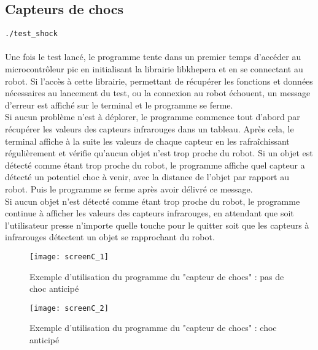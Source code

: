 \documentclass[11pt]{article} %
\begin{document}
\subsection{Capteurs de chocs}
\verb|./test_shock|\\
 \\
Une fois le test lancé, le programme tente dans un premier temps d’accéder au microcontrôleur pic en initialisant la librairie libkhepera et en se connectant au robot. Si l’accès à cette librairie, permettant de récupérer les fonctions et données nécessaires au lancement du test, ou la connexion au robot échouent, un message d’erreur est affiché sur le terminal et le programme se ferme.\\
Si aucun problème n’est à déplorer, le programme commence tout d’abord par récupérer les valeurs des capteurs infrarouges dans un tableau. Après cela, le terminal affiche à la suite les valeurs de chaque capteur en les rafraîchissant régulièrement et vérifie qu’aucun objet n’est trop proche du robot. Si un objet est détecté comme étant trop proche du robot, le programme affiche quel capteur a détecté un potentiel choc à venir, avec la distance de l’objet par rapport au robot. Puis le programme se ferme après avoir délivré ce message.\\
Si aucun objet n’est détecté comme étant trop proche du robot, le programme continue à afficher les valeurs des capteurs infrarouges, en attendant que soit l’utilisateur presse n’importe quelle touche pour le quitter soit que les capteurs à infrarouges détectent un objet se rapprochant du robot.\\
\begin{figure}[H]
	\centering
	\caption{Exemple d'utilisation du programme du "capteur de chocs" : pas de choc anticipé}
	\texttt{[image: screenC\_1]}
\end{figure}
\begin{figure}[H]
	\centering
	\caption{Exemple d'utilisation du programme du "capteur de chocs" : choc anticipé}
	\texttt{[image: screenC\_2]}
\end{figure}
\pagebreak
\listoffigures
\end{document}
